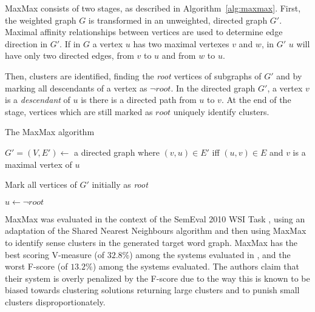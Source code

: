 MaxMax consists of two stages, as described in Algorithm~\ref{alg:maxmax}.
First, the weighted graph $G$ is transformed in an unweighted, directed graph
$G'$. Maximal affinity relationships between vertices are used to determine edge
direction in $G'$. If in $G$ a vertex $u$ has two maximal vertexes $v$ and $w$,
in $G'$ $u$ will have only two directed edges, from $v$ to $u$ and from $w$ to
$u$.

Then, clusters are identified, finding the \textit{root} vertices of subgraphs
of $G'$ and by marking all descendants of a vertex as $\neg root$. In the
directed graph $G'$, a vertex $v$ is a \textit{descendant} of $u$ is there is a
directed path from $u$ to $v$. At the end of the stage, vertices which are still
marked as $root$ uniquely identify clusters.

\begin{algorithm}
 \caption{The MaxMax algorithm}
 \label{alg:maxmax}
 \begin{algorithmic}
   \State $G' = (V, E') \gets$ a directed graph where $(v,u) \in E'$ iff
   $(u,v) \in E$ and $v$ is a maximal vertex of $u$

   \State Mark all vertices of $G'$ initially as \textit{root}

      \State $u \gets \neg root$
     \EndFor
    \EndIf
   \EndFor
  \EndFunction
 \end{algorithmic}
\end{algorithm}

MaxMax was evaluated in the context of the SemEval 2010 \ac{WSI} Task
\citep{manandhar2010semeval}, using an adaptation of the Shared Nearest
Neighbours algorithm and then using MaxMax to identify sense clusters in the
generated target word graph. MaxMax has the best scoring V-measure (of $32.8\%$)
among the systems evaluated in \citep{manandhar2010semeval}, and the worst
F-score (of $13.2\%$) among the systems evaluated. The authors claim that their
system is overly penalized by the F-score due to the way this is known to be
biased towards clustering solutions returning large clusters and to punish small
clusters disproportionately.

